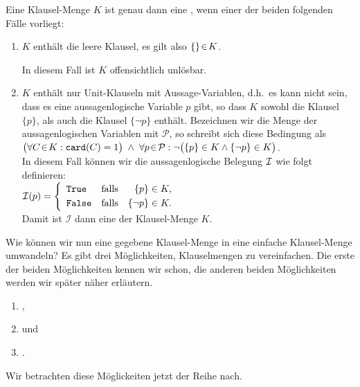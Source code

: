 \begin{Definition}
  Eine Klausel-Menge $K$ ist genau dann eine , wenn
  einer der beiden folgenden Fälle vorliegt:
  \begin{enumerate}
  \item $K$ enthält die leere Klausel, es gilt also $\{\} \!\in\! K$.

        In diesem Fall ist $K$ offensichtlich unlösbar.
  \item $K$ enthält nur Unit-Klauseln mit \underline{} Aussage-Variablen, d.h.~es kann nicht
        sein, dass es eine aussagenlogische Variable $p$ gibt, so dass $K$ sowohl die Klausel $\{p\}$, als auch die
        Klausel $\{\neg p \}$ enthält.  Bezeichnen wir die Menge der aussagenlogischen Variablen mit $\mathcal{P}$,
        so schreibt sich diese Bedingung als 
        \\[0.3cm]
        \hspace*{1.3cm}
        $\bigl(\forall C \!\in\! K: \texttt{card}(C) = 1\bigr) \;\wedge\;
         \forall p \!\in\! \mathcal{P}: \neg\bigl( \{p\} \in K \wedge \{\neg p\} \in K\bigr)$.
        \\[0.3cm]
        In diesem Fall können wir die aussagenlogische Belegung $\mathcal{I}$ wie folgt definieren:
        \\[0.2cm]
        \hspace*{1.3cm}
        $\mathcal{I}(p) = \left\{
                   \begin{array}{lcr}
                     \texttt{True}  & \mbox{falls} & \{p\}      \in K, \\[0.1cm]
                     \texttt{False} & \mbox{falls} & \{\neg p\} \in K.
                   \end{array}
                   \right.
        $
        \\[0.2cm]
        Damit ist $\mathcal{I}$ dann eine  der Klausel-Menge $K$. \eox
  \end{enumerate}
\end{Definition}

Wie können wir nun eine gegebene Klausel-Menge in eine einfache Klausel-Menge umwandeln?
Es gibt drei Möglichkeiten, Klauselmengen zu vereinfachen.  Die erste der beiden Möglichkeiten kennen wir
schon, die anderen beiden Möglichkeiten werden wir später näher erläutern.
\begin{enumerate}
\item {},
\item {} und
\item {}.
\end{enumerate}
Wir betrachten diese Möglickeiten jetzt der Reihe nach.

